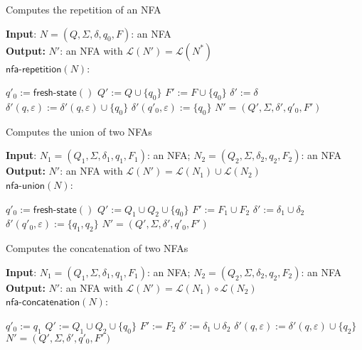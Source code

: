 \documentclass[11pt]{article}
\newcommand*{\Language}[1]{\ensuremath{\mathcal{L}(#1)}}
\begin{document}
\begin{algorithm}
\small
\caption{Computes the repetition of an NFA}
\vspace*{1ex}
{\textbf{Input}:} 
$N = (Q, \Sigma, \delta, q_0, F)$: an NFA \\
\textbf{Output:}
$N'$: an NFA with $\Language{N'} = \Language{N^*}$ \\

$\textsf{nfa-repetition}(N)$:
\begin{algorithmic}[1]
\State $q'_0 := \textsf{fresh-state}()$
\State $Q' := Q \cup \{ q_0 \}$
\State $F' := F \cup \{ q_0 \}$
\State $\delta' := \delta$
    \State $\delta'(q, \varepsilon) := \delta'(q, \varepsilon) \cup \{ q_0 \}$
\EndFor
\State $\delta'(q'_0, \varepsilon) := \{ q_0 \}$
\State \Return $N' = (Q', \Sigma, \delta', q'_0, F')$
\end{algorithmic}
\end{algorithm}

\begin{algorithm}
\small
\caption{Computes the union of two NFAs}
\vspace*{1ex}
{\textbf{Input}:} 
$N_1 = (Q_1, \Sigma, \delta_1, q_1, F_1)$: an NFA; $N_2 = (Q_2, \Sigma, \delta_2, q_2, F_2)$: an NFA \\
\textbf{Output:}
$N'$: an NFA with $\Language{N'} = \Language{N_1} \cup \Language{N_2}$ \\

$\textsf{nfa-union}(N)$:
\begin{algorithmic}[1]
\State $q'_0 := \textsf{fresh-state}()$
\State $Q' := Q_1 \cup Q_2 \cup \{ q_0 \}$
\State $F' := F_1 \cup F_2$
\State $\delta' := \delta_1 \cup \delta_2$
\State $\delta'(q'_0, \varepsilon) := \{ q_1, q_2 \}$
\State \Return $N' = (Q', \Sigma, \delta', q'_0, F')$
\end{algorithmic}
\end{algorithm}

\begin{algorithm}
\small
\caption{Computes the concatenation of two NFAs}
\vspace*{1ex}
{\textbf{Input}:} 
$N_1 = (Q_1, \Sigma, \delta_1, q_1, F_1)$: an NFA; $N_2 = (Q_2, \Sigma, \delta_2, q_2, F_2)$: an NFA \\
\textbf{Output:}
$N'$: an NFA with $\Language{N'} = \Language{N_1} \circ \Language{N_2}$ \\

$\textsf{nfa-concatenation}(N)$:
\begin{algorithmic}[1]
\State $q'_0 := q_1$
\State $Q' := Q_1 \cup Q_2 \cup \{ q_0 \}$
\State $F' := F_2$
\State $\delta' := \delta_1 \cup \delta_2$
    \State $\delta'(q, \varepsilon) := \delta'(q, \varepsilon) \cup \{ q_2 \}$
\EndFor
\State \Return $N' = (Q', \Sigma, \delta', q'_0, F')$
\end{algorithmic}
\end{algorithm}
\end{document}

